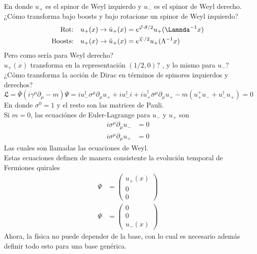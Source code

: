 \documentclass[../main.tex]{subfiles}
\begin{document}
En donde $u_+$ es el spinor de Weyl izquierdo y $u_-$ es el spinor de Weyl derecho. \\
¿Cómo transforma bajo boosts y bajo rotacione un spinor de Weyl izquierdo?
\begin{align*}
  \text{Rot:} \quad u_+(x) \rightarrow \tilde{u}_+(x) & = e^{\vec{\varphi}\cdot \vec{\sigma}/2} u_+(\Lamnda^{-1}x) \\
  \text{Boosts:} \quad u_+(x) \rightarrow \tilde{u}_+(x) & = e^{\vec{\chi}\cdot / 2} u_+(\Lambda^{-1}x)
\end{align*}
Pero como sería para Weyl derecho? \\
$u_+(x)$ transforma en la representación $(1/2,0)$? , y lo mismo para $u_-$? \\
¿Cómo transforma la acción de Dirac en términos de spinores izquierdos y derechos?
\begin{equation*}
  \mathfrak{L}  = \bar{\Psi} \left( i\gamma^\mu \partial_\mu - m \right)\Psi = iu^\dagger_- \sigma^\mu \partial_\mu u_+ + iu^\dagger_- i+ i u^\dagger_+ \bar{\sigma}^\mu \partial_\mu u_+ - m \left( u^+_+ u_- + u^\dagger_- u_+  \right) = 0
\end{equation*}
En donde $\sigma^0=1$ y el resto son las matrices de Pauli. \\
Si $m=0$, las ecuaciónes de Euler-Lagrange para $u_-$ y $u_+$ son
\begin{align*}
  i\sigma^\mu \partial_\mu u_- & = 0 \\
  i\sigma^\mu \partial_\mu u_+ & = 0
\end{align*}
Las cuales son llamadas las ecuaciones de Weyl. \\
Estas ecuaciones definen de manera consistente la evolución temporal de Fermiones quirales
\begin{align*}
  \Psi & = \begin{pmatrix}
    u_+(x) \\ 0 \\ 0
  \end{pmatrix} \\
  \Psi & = \begin{pmatrix}
    0 \\ 0 \\ u_-(x) 
  \end{pmatrix}
\end{align*}
Ahora, la física no puede depender de la base, con lo cual es necesario además definir todo esto para una base genérica.
\end{document}
